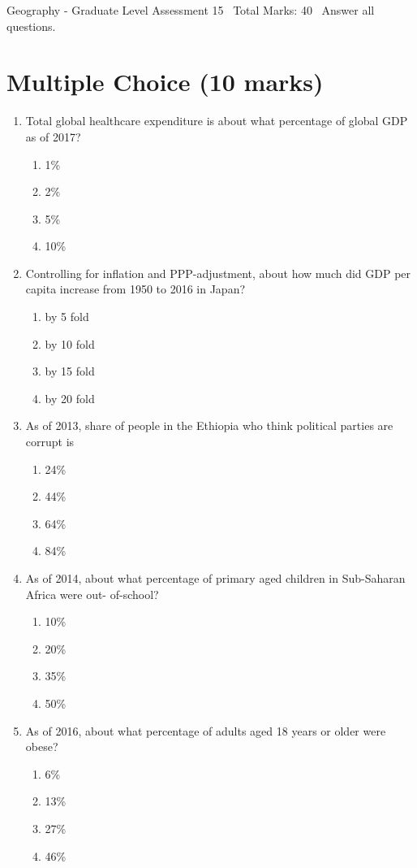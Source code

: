 \documentclass[12pt]{article}
\begin{document}
\begin{center}
Geography - Graduate Level Assessment 15 \
Total Marks: 40 \
Answer all questions.
\end{center}

\section*{Multiple Choice (10 marks)}
\begin{enumerate}[label=\arabic*.]
\item Total global healthcare expenditure is about what percentage of global GDP as of 2017?
\begin{enumerate}[label=(\alph*)]
    \item 1\%
    \item 2\%
    \item 5\%
    \item 10\%
\end{enumerate}
\item Controlling for inflation and PPP-adjustment, about how much did GDP per capita increase from 1950 to 2016 in Japan?
\begin{enumerate}[label=(\alph*)]
    \item by 5 fold
    \item by 10 fold
    \item by 15 fold
    \item by 20 fold
\end{enumerate}
\item As of 2013, share of people in the Ethiopia who think political parties are corrupt is
\begin{enumerate}[label=(\alph*)]
    \item 24\%
    \item 44\%
    \item 64\%
    \item 84\%
\end{enumerate}
\item As of 2014, about what percentage of primary aged children in Sub-Saharan Africa were out- of-school?
\begin{enumerate}[label=(\alph*)]
    \item 10\%
    \item 20\%
    \item 35\%
    \item 50\%
\end{enumerate}
\item As of 2016, about what percentage of adults aged 18 years or older were obese?
\begin{enumerate}[label=(\alph*)]
    \item 6\%
    \item 13\%
    \item 27\%
    \item 46\%
\end{enumerate}
\end{enumerate}
\end{document}
